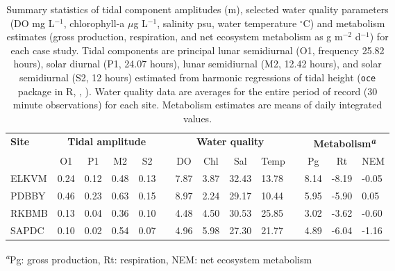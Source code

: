 \documentclass[letterpaper,12pt,oneside]{article}\usepackage[]{graphicx}\usepackage[]{color}
\begin{document}
%
\begin{table}[!tbp]
\caption{Summary statistics of tidal component amplitudes (m), selected water quality parameters (\ac{DO} mg L$^{-1}$, chlorophyll-a $\mu$g L$^{-1}$, salinity psu, water temperature $^{\circ}$C)  and metabolism estimates (gross production, respiration, and net ecosystem metabolism as g m$^{-2}$ d$^{-1}$) for each case study.  Tidal components are principal lunar semidiurnal (O1, frequency 25.82 hours), solar diurnal (P1, 24.07 hours), lunar semidiurnal (M2, 12.42 hours), and solar semidiurnal (S2, 12 hours) estimated from harmonic regressions of tidal height (\texttt{oce} package in R, \citealt{Foreman89}, ).  Water quality data are averages for the entire period of record (30 minute observations) for each site.  Metabolism estimates are means of daily integrated values.\label{tab:case_att}} 
\begin{center}
\begin{tabular}{lllllcllllclll}
\hline\hline
\multicolumn{1}{l}{\bfseries Site}&\multicolumn{4}{c}{\bfseries Tidal amplitude}&\multicolumn{1}{c}{\bfseries }&\multicolumn{4}{c}{\bfseries Water quality}&\multicolumn{1}{c}{\bfseries }&\multicolumn{3}{c}{\bfseries Metabolism\textsuperscript{\textit{a}}}\tabularnewline
\cline{2-5} \cline{7-10} \cline{12-14}
\multicolumn{1}{l}{}&\multicolumn{1}{c}{O1}&\multicolumn{1}{c}{P1}&\multicolumn{1}{c}{M2}&\multicolumn{1}{c}{S2}&\multicolumn{1}{c}{}&\multicolumn{1}{c}{DO}&\multicolumn{1}{c}{Chl}&\multicolumn{1}{c}{Sal}&\multicolumn{1}{c}{Temp}&\multicolumn{1}{c}{}&\multicolumn{1}{c}{Pg}&\multicolumn{1}{c}{Rt}&\multicolumn{1}{c}{NEM}\tabularnewline
\hline
ELKVM&0.24&0.12&0.48&0.13&&7.87&3.87&32.43&13.78&&8.14&-8.19&-0.05\tabularnewline
PDBBY&0.46&0.23&0.63&0.15&&8.97&2.24&29.17&10.44&&5.95&-5.90& 0.05\tabularnewline
RKBMB&0.13&0.04&0.36&0.10&&4.48&4.50&30.53&25.85&&3.02&-3.62&-0.60\tabularnewline
SAPDC&0.10&0.02&0.54&0.07&&4.96&5.98&27.30&21.77&&4.89&-6.04&-1.16\tabularnewline
\hline
\end{tabular}
\end{center}
\footnotesize\textsuperscript{\textit{a}}Pg: gross production, Rt: respiration, NEM: net ecosystem metabolism\end{table}
\end{document}
